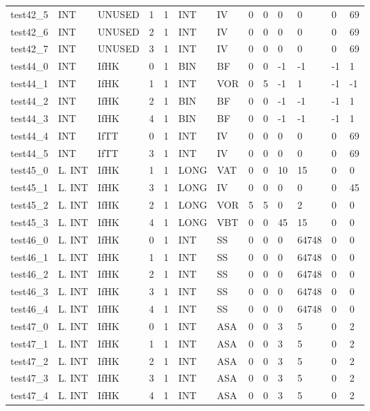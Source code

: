 \begin{longtable}{|l|l|l|p{0.5cm}|p{0.5cm}|l|p{0.5cm}|p{0.5cm}|p{0.5cm}|l|l|p{0.5cm}|l|}
test42\_5 & INT & UNUSED & 1 & 1 & INT & IV & 0 & 0 & 0 & 0 & 0 & 69 \\
test42\_6 & INT & UNUSED & 2 & 1 & INT & IV & 0 & 0 & 0 & 0 & 0 & 69 \\
test42\_7 & INT & UNUSED & 3 & 1 & INT & IV & 0 & 0 & 0 & 0 & 0 & 69 \\
test44\_0 & INT & IfHK & 0 & 1 & BIN & BF & 0 & 0 & -1 & -1 & -1 & 1 \\
test44\_1 & INT & IfHK & 1 & 1 & INT & VOR & 0 & 5 & -1 & 1 & -1 & -1 \\
test44\_2 & INT & IfHK & 2 & 1 & BIN & BF & 0 & 0 & -1 & -1 & -1 & 1 \\
test44\_3 & INT & IfHK & 4 & 1 & BIN & BF & 0 & 0 & -1 & -1 & -1 & 1 \\
test44\_4 & INT & IfTT & 0 & 1 & INT & IV & 0 & 0 & 0 & 0 & 0 & 69 \\
test44\_5 & INT & IfTT & 3 & 1 & INT & IV & 0 & 0 & 0 & 0 & 0 & 69 \\
test45\_0 & L. INT & IfHK & 1 & 1 & LONG & VAT & 0 & 0 & 10 & 15 & 0 & 0 \\
test45\_1 & L. INT & IfHK & 3 & 1 & LONG & IV & 0 & 0 & 0 & 0 & 0 & 45 \\
test45\_2 & L. INT & IfHK & 2 & 1 & LONG & VOR & 5 & 5 & 0 & 2 & 0 & 0 \\
test45\_3 & L. INT & IfHK & 4 & 1 & LONG & VBT & 0 & 0 & 45 & 15 & 0 & 0 \\
test46\_0 & L. INT & IfHK & 0 & 1 & INT & SS & 0 & 0 & 0 & 64748 & 0 & 0 \\
test46\_1 & L. INT & IfHK & 1 & 1 & INT & SS & 0 & 0 & 0 & 64748 & 0 & 0 \\
test46\_2 & L. INT & IfHK & 2 & 1 & INT & SS & 0 & 0 & 0 & 64748 & 0 & 0 \\
test46\_3 & L. INT & IfHK & 3 & 1 & INT & SS & 0 & 0 & 0 & 64748 & 0 & 0 \\
test46\_4 & L. INT & IfHK & 4 & 1 & INT & SS & 0 & 0 & 0 & 64748 & 0 & 0 \\
test47\_0 & L. INT & IfHK & 0 & 1 & INT & ASA & 0 & 0 & 3 & 5 & 0 & 2 \\
test47\_1 & L. INT & IfHK & 1 & 1 & INT & ASA & 0 & 0 & 3 & 5 & 0 & 2 \\
test47\_2 & L. INT & IfHK & 2 & 1 & INT & ASA & 0 & 0 & 3 & 5 & 0 & 2 \\
test47\_3 & L. INT & IfHK & 3 & 1 & INT & ASA & 0 & 0 & 3 & 5 & 0 & 2 \\
test47\_4 & L. INT & IfHK & 4 & 1 & INT & ASA & 0 & 0 & 3 & 5 & 0 & 2 \\

\end{longtable}
